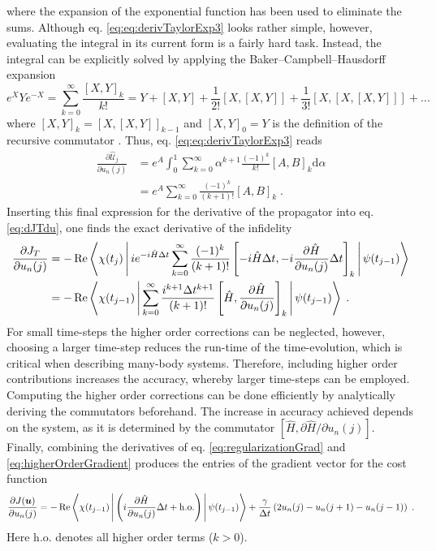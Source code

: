where the expansion of the exponential function has been used to eliminate the sums. Although eq. \eqref{eq:eq:derivTaylorExp3} looks rather simple, however, evaluating the integral in its current form is a fairly hard task. Instead, the integral can be explicitly solved by applying the Baker–Campbell–Hausdorff expansion 
\begin{equation}
	e^X Y e^{-X} = \sum_{k = 0}^{\infty} \frac{ [ X,Y  ]_k }{k!} = Y + [ X,Y  ] + \frac{1}{2!} [ X , [ X,Y  ]] + \frac{1}{3!} [X, [ X , [ X,Y  ]]  ] + ...
\end{equation}
where $[ X , Y ]_k = [ X ,[ X , Y]]_{k-1}$ and $[X,Y]_0 = Y$ is the definition of the recursive commutator \cite{Wilcox1967}. Thus, eq. \eqref{eq:eq:derivTaylorExp3} reads
\begin{align}
	\frac{\partial \hat{\mathcal{U}}_{j}}{\partial u_n (j)} &=  e^A \int_{0}^{1} \sum_{k = 0}^{\infty } \alpha^{k+1} \frac{(-1)^k}{k!} [ A,B  ]_k \mathrm{d}\alpha \nonumber \\
	&= e^A  \sum_{k = 0}^{\infty }  \frac{(-1)^k}{(k+1)!} [ A,B  ]_k \; .
\end{align}
Inserting this final expression for the derivative of the propagator into eq. \eqref{eq:dJTdu}, one finds the exact derivative of the infidelity 
\begin{align}
\frac{\partial J_T}{\partial u_n (j)} &=  - \Re  \Braket{\chi (t_j) | i e^{-i \hat{H} \Delta t}  \sum_{k = 0}^{\infty }  \frac{(-1)^k}{(k+1)!} \left[ -i \hat{H} \Delta t , -i \frac{\partial \hat{H}}{\partial u_n (j)} \Delta t  \right]_k | \psi (t_{j-1})}  \nonumber \\
	&=  - \Re  \Braket{\chi (t_{j-1}) | \sum_{k = 0}^{\infty }  \frac{i^{k+1} \Delta t^{k+1}}{(k+1)!} \left[ \hat{H} , \frac{\partial \hat{H}}{\partial u_n (j)}  \right]_k | \psi (t_{j-1})}  \; . \label{eq:higherOrderGradient}
\end{align}
For small time-steps the higher order corrections can be neglected, however, choosing a larger time-step reduces the run-time of the time-evolution, which is critical when describing many-body systems. Therefore, including higher order contributions increases the accuracy, whereby larger time-steps can be employed. Computing the higher order corrections can be done efficiently by analytically deriving the commutators beforehand. The increase in accuracy achieved depends on the system, as it is determined by the commutator $[ \hat{H} , \partial \hat{H} / \partial u_n (j) ]$.\\
Finally, combining the derivatives of eq. \eqref{eq:regularizationGrad} and \eqref{eq:higherOrderGradient} produces the entries of the gradient vector for the cost function
\begin{equation}
	\frac{\partial J (\boldsymbol{u})}{\partial u_n (j)}  = - \Re \Braket{\chi (t_{j-1}) | \left( i \frac{\partial \hat{H}}{\partial u_n (j)} \Delta t + \mathrm{h.o.} \right)  | \psi (t_{j-1})}  + \frac{\gamma}{\Delta t} \left( 2 u_n (j) - u_n (j+1) - u_n (j-1) \right) \; .
	\label{eq:costGradient}
\end{equation}
Here $\mathrm{h.o.}$ denotes all higher order terms ($k > 0$).\\ 

